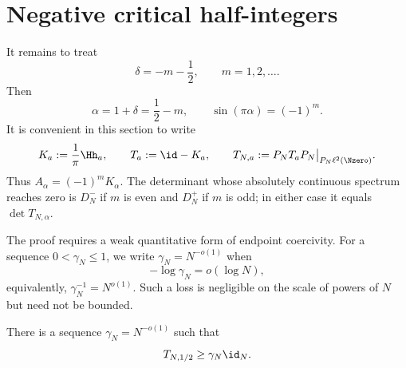 \section{Negative critical half-integers}\label{sec:threshold}

It remains to treat
\begin{equation}\label{eq:threshold-parameter}
 \delta=-m-\frac12,
 \qquad m=1,2,\ldots.
\end{equation}
Then
\[
 \alpha=1+\delta=\frac12-m,
 \qquad
 \sin(\pi\alpha)=(-1)^m.
\]
It is convenient in this section to write
\begin{equation}\label{eq:KTa}
 K_a:=\frac1\pi\Hh_a,
 \qquad
 T_a:=\id-K_a,
 \qquad
 T_{N,a}:=P_NT_aP_N\big|_{P_N\ell^2(\Nzero)}.
\end{equation}
Thus $A_\alpha=(-1)^mK_\alpha$.  The determinant whose absolutely continuous
spectrum reaches zero is $D_N^-$ if $m$ is even and $D_N^+$ if $m$ is odd; in
either case it equals $\det T_{N,\alpha}$.

The proof requires a weak quantitative form of endpoint coercivity.  For a
sequence $0<\gamma_N\le1$, we write $\gamma_N=N^{-o(1)}$ when
\begin{equation}\label{eq:subpolynomial-definition}
 -\log\gamma_N=o(\log N),
\end{equation}
equivalently, $\gamma_N^{-1}=N^{o(1)}$.  Such a loss is negligible on the
scale of powers of $N$ but need not be bounded.

\begin{lemma}[Endpoint coercivity at $a=\frac12$]
\label{lem:positive-endpoint-coercivity}
There is a sequence $\gamma_N=N^{-o(1)}$ such that
\begin{equation}\label{eq:positive-endpoint-coercivity}
 T_{N,1/2}\ge\gamma_N\id_N.
\end{equation}
\end{lemma}

